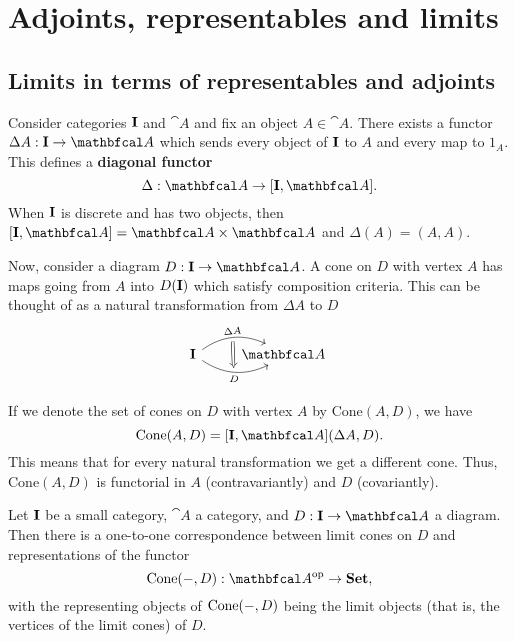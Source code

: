 \section{Adjoints, representables and limits}

\subsection{Limits in terms of representables and adjoints}
Consider categories $\mathbf{I}$ and $\cat{A}$ and fix an object $A\in\cat{A}$. There exists a functor $\Delta A:\bcat{I}\to\cat{A}$ which sends every object of $\mathbf{I}$ to $A$ and every map to $1_A$. This defines a \textbf{diagonal functor}
\begin{equation*}
    \Delta : \cat{A}\to [\bcat{I},\cat{A}].
\end{equation*}
When $\mathbf{I}$ is discrete and has two objects, then $[\bcat{I},\cat{A}]=\cat{A}\times\cat{A}$ and $\Delta(A)=(A,A)$.

Now, consider a diagram $D:\bcat{I}\to\cat{A}$. A cone on $D$ with vertex $A$ has maps going from $A$ into $D(\mathbf{I})$ which satisfy composition criteria. This can be thought of as a natural transformation from $\Delta A$ to $D$
\begin{equation*}
\begin{tikzcd}
    \bcat{I} \arrow[r, bend left=30, sloped, "\Delta A"{name=t}]
    \arrow[r, bend right=30, sloped, "D"'{name=b}]
    & \cat{A} \
    \arrow[from=t, Rightarrow, to=b, "", shorten <= 3pt, shorten >= 3pt]
\end{tikzcd}
\end{equation*}

If we denote the set of cones on $D$ with vertex $A$ by $\text{Cone}(A,D)$, we have
\begin{equation*}
    \text{Cone}(A,D)=[\bcat{I},\cat{A}](\Delta A, D).
\end{equation*}
This means that for every natural transformation we get a different cone. Thus, $\text{Cone}(A,D)$ is functorial in $A$ (contravariantly) and $D$ (covariantly).

\begin{proposition}
    Let $\mathbf{I}$ be a small category, $\cat{A}$ a category, and $D:\bcat{I}\to\cat{A}$ a diagram. Then there is a one-to-one correspondence between limit cones on $D$ and representations of the functor
    \begin{equation*}
        \textup{Cone}(-,D): \catop{A}\to\bcat{Set},
    \end{equation*}
    with the representing objects of $\textup{Cone}(-,D)$ being the limit objects (that is, the vertices of the limit cones) of $D$.
\end{proposition}

